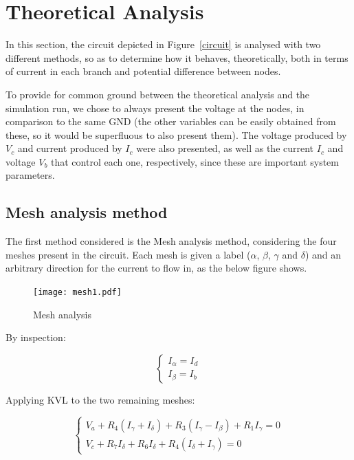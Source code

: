 \section{Theoretical Analysis}
\label{sec:analysis}

In this section, the circuit depicted in Figure~\ref{circuit} is analysed with two different methods, so as to determine how it behaves, theoretically, both in terms of current in each branch and potential difference between nodes.

To provide for common ground between the theoretical analysis and the simulation run, we chose to always present the voltage at the nodes, in comparison to the same GND (the other variables can be easily obtained from these, so it would be superfluous to also present them). The voltage produced by $V_c$ and current produced by $I_c$ were also presented, as well as the current $I_c$ and voltage $V_b$ that control each one, respectively, since these are important system parameters.

\subsection{Mesh analysis method}

The first method considered is the Mesh analysis method, considering the four meshes present in the circuit. Each mesh is given a label ($\alpha$, $\beta$, $\gamma$ and $\delta$) and an arbitrary direction for the current to flow in, as the below figure shows.

\begin{figure}[H]
  \centering
  \texttt{[image: mesh1.pdf]}
  \caption{Mesh analysis}
  \label{mesh_fig}
\end{figure}

\newpage

By inspection:

\begin{equation}
  \begin{cases}
    I_{\alpha} = I_d \\
    I_{\beta} = I_b
  \end{cases}
\end{equation}

Applying KVL to the two remaining meshes:

\begin{equation}
  \begin{cases}
    V_a + R_4 (I_\gamma + I_\delta) + R_3 (I_\gamma - I_\beta) + R_1 I_\gamma = 0 \\
    V_c + R_7 I_\delta + R_6 I_\delta + R_4 (I_\delta + I_\gamma) = 0
  \end{cases}
\end{equation}

